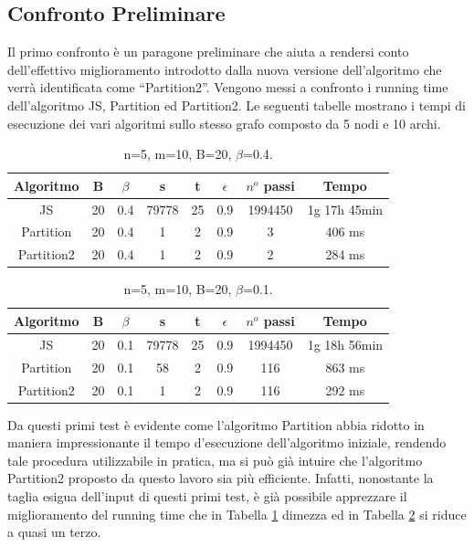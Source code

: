 \subsection{Confronto Preliminare}
Il primo confronto è un paragone preliminare che aiuta a rendersi conto dell'effettivo miglioramento introdotto dalla nuova versione dell'algoritmo che verrà identificata come ``Partition2''. Vengono messi a confronto i running time dell'algoritmo JS, Partition ed Partition2. Le seguenti tabelle mostrano i tempi di esecuzione dei vari algoritmi sullo stesso grafo composto da 5 nodi e 10 archi.
\begin{table}[]
	\centering
	\begin{tabular}{|c|c|c|c|c|c|c|c|}
		\hline
		Algoritmo & B  & $\beta$ & s     & t  & $\epsilon$ & $n^o$ passi & Tempo        \\ \hline
		JS     & 20 & 0.4     & 79778 & 25 & 0.9        & 1994450  & 1g 17h 45min \\ \hline
		Partition & 20 & 0.4     & 1     & 2  & 0.9        & 3        & 406 ms       \\ \hline
		Partition2  & 20 & 0.4     & 1     & 2  & 0.9        & 2        & 284 ms       \\ \hline
	\end{tabular}
	\caption{n=5, m=10, B=20, $\beta$=0.4.}\label{tab:1}
\end{table}
\begin{table}[]
	\centering
	\begin{tabular}{|c|c|c|c|c|c|c|c|}
		\hline
		Algoritmo & B  & $\beta$ & s     & t  & $\epsilon$ & $n^o$ passi & Tempo        \\ \hline
		JS     & 20 & 0.1     & 79778 & 25 & 0.9        & 1994450  & 1g 18h 56min \\ \hline
		Partition & 20 & 0.1     & 58     & 2  & 0.9        & 116        & 863 ms       \\ \hline
		Partition2  & 20 & 0.1     & 1     & 2  & 0.9        & 116        & 292 ms       \\ \hline
	\end{tabular}
	\caption{n=5, m=10, B=20, $\beta$=0.1.}\label{tab:2}
\end{table}
Da questi primi test è evidente come l'algoritmo Partition abbia ridotto in maniera impressionante il tempo d'esecuzione dell'algoritmo iniziale, rendendo tale procedura utilizzabile in pratica, ma si può già intuire che l'algoritmo Partition2 proposto da questo lavoro sia più efficiente. Infatti, nonostante la taglia esigua dell'input di questi primi test, è già possibile apprezzare il miglioramento del running time che in Tabella \ref{tab:1} dimezza ed in Tabella \ref{tab:2} si riduce a quasi un terzo.\\
